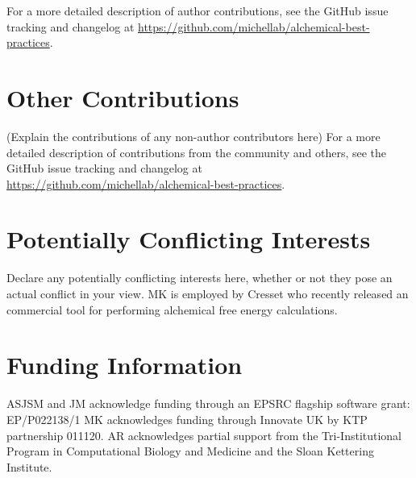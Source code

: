 \documentclass[9pt,bestpractices]{livecoms}
\newcommand{\githubrepository}{\url{https://github.com/michellab/alchemical-best-practices}}  %
\begin{document}
For a more detailed description of author contributions,
see the GitHub issue tracking and changelog at \githubrepository.

\section*{Other Contributions}
%

(Explain the contributions of any non-author contributors here)
For a more detailed description of contributions from the community and others, see the GitHub issue tracking and changelog at \githubrepository.



\section*{Potentially Conflicting Interests}

Declare any potentially conflicting interests here, whether or not they pose an actual conflict in your view.
MK is employed by Cresset who recently released an commercial tool for performing alchemical free energy calculations.

\section*{Funding Information}
ASJSM and JM acknowledge funding through an EPSRC flagship software grant: EP/P022138/1
MK acknowledges funding through Innovate UK by KTP partnership 011120.
AR acknowledges partial support from the Tri-Institutional Program in Computational Biology and Medicine and the Sloan Kettering Institute.




\end{document}
